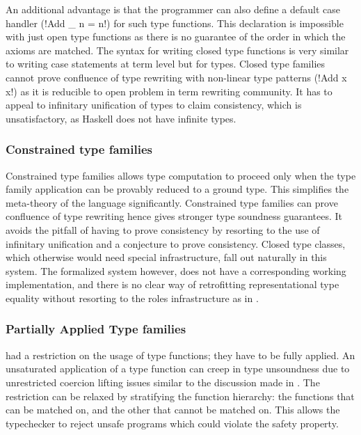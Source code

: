 \documentclass[screen,nonacm]{acmart}
\begin{document}
An additional advantage is that the programmer can also define a default case handler (!Add _ n = n!) for such type functions. This declaration is impossible with just open type functions as there is no guarantee of the order in which the axioms are matched. The syntax for writing closed type functions is very similar to writing case statements at term level but for types. Closed type families cannot prove confluence of type rewriting with non-linear type patterns (!Add x x!) as it is reducible to open problem in term rewriting community\cite{mizuhito_rta_1995}. It has to appeal to infinitary unification\cite{jaffar_efficient_1984} of types to claim consistency, which is unsatisfactory, as Haskell does not have infinite types.

\subsubsection{Constrained type families}
Constrained type families\cite{morris_typefamilies_2017} allows type computation to proceed only when the type family application can be provably reduced to a ground type. This simplifies the meta-theory of the language significantly. Constrained type families can prove confluence of type rewriting hence gives stronger type soundness guarantees. It avoids the pitfall of having to prove consistency by resorting to the use of infinitary unification and a conjecture to prove consistency. Closed type classes, which otherwise would need special infrastructure, fall out naturally in this system. The formalized system however, does not have a corresponding  working implementation, and there is no clear way of retrofitting representational type equality without resorting to the roles infrastructure as in \SFR.

\subsubsection{Partially Applied Type families}
\SFC had a restriction on the usage of type functions; they have to
be fully applied. An unsaturated application of a type function can
creep in type unsoundness due to unrestricted coercion lifting issues
similar to the discussion made in \SFP. The restriction can be
relaxed by stratifying the function
hierarchy\cite{kiss_higher-order_2019}: the functions that can be
matched on, and the other that cannot be matched on. This allows the
typechecker to reject unsafe programs which could violate the
safety property.
\end{document}
